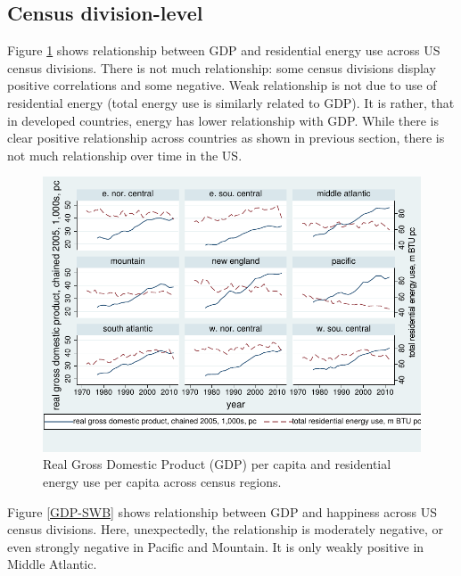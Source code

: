 \documentclass[10pt, letterpaper]{article}
\begin{document}
\begin{spacing}{1.5}
\section{Census division-level}

Figure \ref{GDP-TERPB} shows relationship between GDP and residential
energy use across US census divisions. There is not much relationship: some census divisions
display positive correlations and some negative. Weak relationship is not due to
use of residential energy (total energy use is similarly related to GDP). It is
rather, that in developed countries, energy has lower relationship with GDP.
While there is clear positive relationship across countries as shown in previous
section, there is not much relationship over time in the US.

\begin{figure}[H]
 \includegraphics[width=7in]{GDP-TERPB-INKSCAPE.pdf}\centering \caption{Real Gross Domestic
   Product (GDP) per capita and residential energy use per capita across  census regions.}\label{GDP-TERPB} 
\end{figure}

Figure \ref{GDP-SWB} shows relationship between GDP and happiness across US census divisions.
Here, unexpectedly, the relationship is moderately negative, or even strongly
negative in Pacific and Mountain. It is only weakly positive in Middle
Atlantic. %


\end{spacing}
\end{document}
